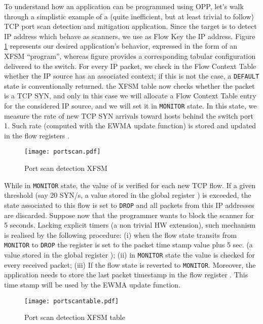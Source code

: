 \documentclass{sig-alternate}
\begin{document}
To understand how an application can be programmed using OPP, let's walk through a simplistic example of a (quite inefficient, but at least trivial to follow) TCP port scan detection and mitigation application. Since the target is to detect IP address which behave as scanners, we use as Flow Key the IP address. Figure \ref{F:portscan} represents our desired application's behavior, expressed in the form of an XFSM ``program'', whereas figure \label{F:pscan_table} provides a corresponding tabular configuration delivered to the switch. For every IP packet, we check in the Flow Context Table whether the IP source has an associated context; if this is not the case, a \texttt{DEFAULT} state is conventionally returned. the XFSM table now checks whether the packet is a TCP SYN, and only in this case we will allocate a Flow Context Table entry for the considered IP source, and we will set it in \texttt{MONITOR} state. In this state, we measure the rate of new TCP SYN arrivals toward hosts behind the switch port 1. Such rate (computed with the EWMA update function) is stored and updated in the flow registers . 

\begin{figure}[t]
\centering
   \texttt{[image: portscan.pdf]}
      	  \vspace{-2.2em}
\caption{Port scan detection XFSM}
\label{F:portscan}
\end{figure}

While in \texttt{MONITOR} state, the value of  is verified for each new TCP flow. If a given threshold (say 20 SYN/s, a value stored in the global register ) is exceeded, the state associated to this flow is set to \texttt{DROP} and all packets from this IP addresses are discarded. Suppose now that the programmer wants to block the scanner for 5 seconds. Lacking explicit timers (a non trivial HW extension), such mechanism is realised by the following procedure:  (i) when the flow state transits from \texttt{MONITOR} to \texttt{DROP} the register  is set to the packet time stamp value plus 5 sec. (a value stored in the global register ); (ii) in \texttt{MONITOR} state the  value is checked for every received packet; (iii) If  the flow state is reverted to \texttt{MONITOR}. Moreover, the application needs to store the last packet timestamp in the flow register . This time stamp will be used by the EWMA update function. 

\begin{figure}[t]
\centering
   \texttt{[image: portscantable.pdf]}
         	  \vspace{-2em}
\caption{Port scan detection XFSM table}
      	  \vspace{-1.5em}
\label{F:pscan_table}
\end{figure}
\end{document}

